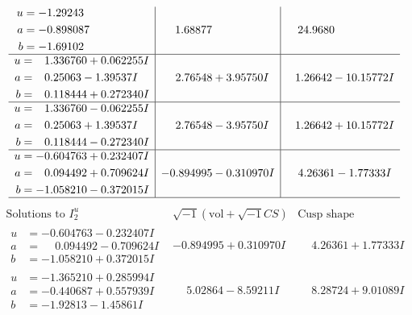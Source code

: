 \documentclass[1p]{elsarticle_modified}
\theoremstyle{definition}
\newcommand{\I}{\sqrt{-1}}
\begin{document}
$$\begin{array}{c|c|c}
\begin{aligned}
u &= -1.29243\phantom{ +0.000000I} \\
a &= -0.898087\phantom{ +0.000000I} \\
b &= -1.69102\phantom{ +0.000000I}\end{aligned}
 & \phantom{-}1.68877\phantom{ +0.000000I} & \phantom{-}24.9680\phantom{ +0.000000I} \\ \hline\begin{aligned}
u &= \phantom{-}1.336760 + 0.062255 I \\
a &= \phantom{-}0.25063 - 1.39537 I \\
b &= \phantom{-}0.118444 + 0.272340 I\end{aligned}
 & \phantom{-}2.76548 + 3.95750 I & \phantom{-}1.26642 - 10.15772 I \\ \hline\begin{aligned}
u &= \phantom{-}1.336760 - 0.062255 I \\
a &= \phantom{-}0.25063 + 1.39537 I \\
b &= \phantom{-}0.118444 - 0.272340 I\end{aligned}
 & \phantom{-}2.76548 - 3.95750 I & \phantom{-}1.26642 + 10.15772 I \\ \hline\begin{aligned}
u &= -0.604763 + 0.232407 I \\
a &= \phantom{-}0.094492 + 0.709624 I \\
b &= -1.058210 - 0.372015 I\end{aligned}
 & -0.894995 - 0.310970 I & \phantom{-}4.26361 - 1.77333 I\\
 \hline 
 \end{array}$$\newpage$$\begin{array}{c|c|c}  
\text{Solutions to }I^u_{2}& \I (\text{vol} + \sqrt{-1}CS) & \text{Cusp shape}\\
 \hline 
\begin{aligned}
u &= -0.604763 - 0.232407 I \\
a &= \phantom{-}0.094492 - 0.709624 I \\
b &= -1.058210 + 0.372015 I\end{aligned}
 & -0.894995 + 0.310970 I & \phantom{-}4.26361 + 1.77333 I \\ \hline\begin{aligned}
u &= -1.365210 + 0.285994 I \\
a &= -0.440687 + 0.557939 I \\
b &= -1.92813 - 1.45861 I\end{aligned}
 & \phantom{-}5.02864 - 8.59211 I & \phantom{-}8.28724 + 9.01089 I \\ \hline\begin{aligned}

\end{aligned}
\end{array}$$
\end{document}
